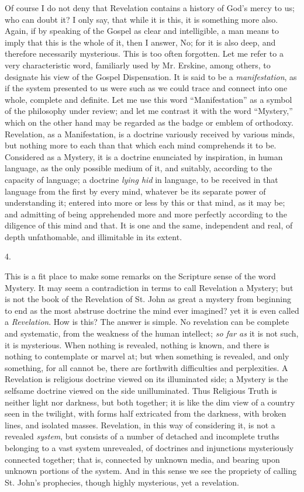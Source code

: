 Of course I do not deny that Revelation contains
a history of God's mercy to us; who can doubt it? I only say, that
while it is this, it is something more also. Again, if by speaking of
the Gospel as clear and intelligible, a man means to imply that this
is the whole of it, then I answer, No; for it is also deep, and
therefore necessarily mysterious. This is too often forgotten. Let me
refer to a very characteristic word, familiarly used by Mr. Erskine,
among others, to designate his view of the Gospel Dispensation. It is
said to be a \emph{manifestation}, as if the system presented to us
were such as we could trace and connect into one whole, complete and
definite. Let me use this word ``Manifestation'' as a symbol of the
philosophy under review; and let me contrast it with the word ``Mystery,'' which on the other hand may be regarded as the
badge or emblem of orthodoxy. Revelation, as a Manifestation, is a
doctrine variously received by various minds, but nothing more to each
than that which each mind comprehends it to be. Considered as a
Mystery, it is a doctrine enunciated by inspiration, in human
language, as the only possible medium of it, and suitably, according
to the capacity of language; a doctrine \emph{lying hid} in language,
to be received in that language from the first by every mind, whatever
be its separate power of understanding it; entered into more or less
by this or that mind, as it may be; and admitting of being apprehended
more and more perfectly according to the diligence of this mind and
that. It is one and the same, independent and real, of depth
unfathomable, and illimitable in its extent.

4.

This is a fit place to make some remarks on the
Scripture sense of the word Mystery. It may seem a contradiction in
terms to call Revelation a Mystery; but is not the book of the
Revelation of St. John as great a mystery from beginning to end as the
most abstruse doctrine the mind ever imagined? yet it is even called a
\emph{Revelation}. How is this? The answer is simple. No revelation
can be complete and systematic, from the weakness of the human
intellect; \emph{so far as} it is not such, it is mysterious. When
nothing is revealed, nothing is known, and there is nothing to
contemplate or marvel at; but when something is revealed, and only
something, for all cannot be, there are forthwith difficulties and
perplexities. A Revelation is religious doctrine viewed on its
illuminated side; a Mystery is the selfsame doctrine viewed on the
side unilluminated. Thus Religious Truth is neither light nor
darkness, but both together; it is like the dim view of a country
seen in the twilight, with forms half extricated from the darkness,
with broken lines, and isolated masses. Revelation, in this way of
considering it, is not a revealed \emph{system}, but consists of a
number of detached and incomplete truths belonging to a vast system
unrevealed, of doctrines and injunctions mysteriously connected
together; that is, connected by unknown media, and bearing upon
unknown portions of the system. And in this sense we see the propriety
of calling St. John's prophecies, though highly mysterious, yet a
revelation.

